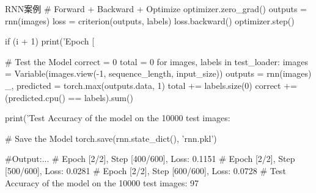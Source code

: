 \documentclass[openbib]{article}
\begin{document}
\begin{Python}{RNN案例}
# Forward + Backward + Optimize
optimizer.zero_grad()
outputs = rnn(images)
loss = criterion(outputs, labels)
loss.backward()
optimizer.step()

if (i + 1) %
print('Epoch [%

# Test the Model
correct = 0
total = 0
for images, labels in test_loader:
	images = Variable(images.view(-1, sequence_length, input_size))
	outputs = rnn(images)
	_, predicted = torch.max(outputs.data, 1)
	total += labels.size(0)
	correct += (predicted.cpu() == labels).sum()

print('Test Accuracy of the model on the 10000 test images: %

# Save the Model
torch.save(rnn.state_dict(), 'rnn.pkl')

#Output:...
#       Epoch [2/2], Step [400/600], Loss: 0.1151
#       Epoch [2/2], Step [500/600], Loss: 0.0281
#       Epoch [2/2], Step [600/600], Loss: 0.0728
#       Test Accuracy of the model on the 10000 test images: 97 %
\end{Python}
\end{document}

